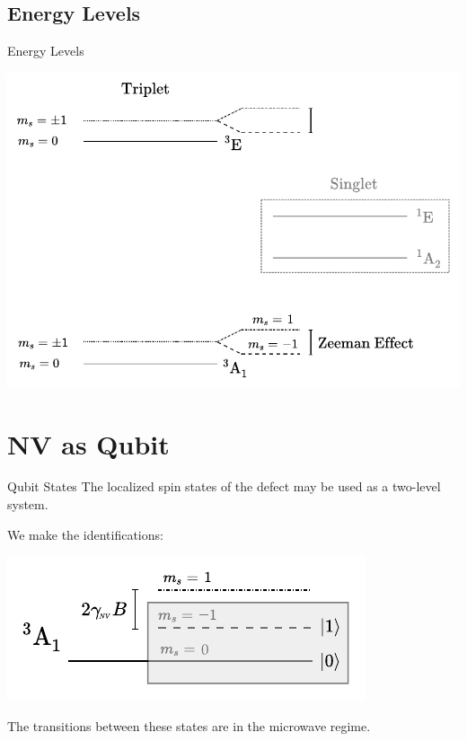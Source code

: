 \documentclass[11pt]{beamer}
\begin{document}
\subsection{Energy Levels}
\begin{frame}{Energy Levels}
\begin{center}
\includegraphics[scale=0.76]{energy_raw.pdf}
\end{center}
\vspace{0.7cm}
\end{frame}

\section{NV as Qubit}

\begin{frame}{Qubit States}
The localized spin states of the defect may be used as a two-level system.

We make the identifications:

\begin{center}
\includegraphics[scale=1.3]{energy_qubit.pdf}
\end{center}

The transitions between these states are in the microwave regime.
\end{frame}
\end{document}
